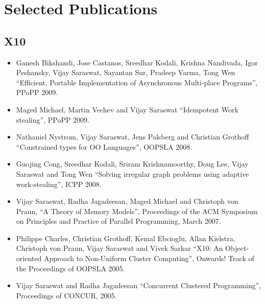 \documentclass{article}
\begin{document}
\section*{Selected Publications}
\subsection*{X10}
\begin{itemize}
\item Ganesh Bikshandi, Jose Castanos, Sreedhar Kodali, Krishna Nandivada, Igor Peshansky, Vijay Saraswat, Sayantan Sur, Pradeep Varma, Tong Wen ``Efficient, Portable Implementation of Asynchronous Multi-place Programs'', PPoPP 2009.

\item Maged Michael, Martin Vechev and Vijay Saraswat ``Idempotent Work stealing'', PPoPP 2009.

\item Nathaniel Nystrom, Vijay Saraswat, Jens Palsberg and Christian
Grothoff ``Constrained types for OO Languages'', OOPSLA
2008.

\item Guojing Cong, Sreedhar Kodali, Sriram Krishnamoorthy, Doug Lee,
Vijay Saraswat and Tong Wen ``Solving irregular graph problems using
adaptive work-stealing'', ICPP 2008.

\item Vijay Saraswat, Radha Jagadeesan, Maged Michael and Christoph
von Praun, ``A Theory of Memory Models'', Proceedings of the ACM
Symposium on Principles and Practice of Parallel Programming, March
2007.

\item Philippe Charles, Christian Grothoff, Kemal Ebcioglu, Allan
  Kielstra, Christoph von Praun, Vijay Saraswat and Vivek Sarkar
  ``X10: An Object-oriented Approach to Non-Uniform Cluster
  Computing'', Onwards! Track of the Proceedings of OOPSLA 2005.

\item Vijay Saraswat and Radha Jagadeesan ``Concurrent Clustered
  Programming'', Proceedings of CONCUR, 2005.

\end{itemize}				   
\end{document}
